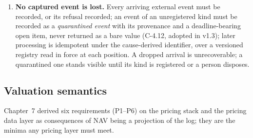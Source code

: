 \documentclass[11pt,a4paper]{article}
\begin{document}
\begin{enumerate}[label=\textbf{M\arabic*.}, ref=M\arabic*, leftmargin=*, itemsep=3pt]
  sufficiency obligation of Chapter~\ref{ch:collateral} and Chapter~\ref{ch:invariants}.
\item \textbf{No captured event is lost.} Every arriving external event must be recorded,
  or its refusal recorded; an event of an unregistered kind must be recorded as a
  \emph{quarantined event} with its provenance and a deadline-bearing open item, never
  returned as a bare value (C-4.12, adopted in v1.3); later processing is idempotent
  under the cause-derived identifier, over a versioned registry read in force at each
  position. A dropped arrival is unrecoverable; a quarantined one stands visible until its
  kind is registered or a person disposes.
\end{enumerate}

\subsection{Valuation semantics}

Chapter~7 derived six requirements (P1--P6) on the pricing stack and the pricing data layer as
consequences of NAV being a projection of the log; they are the minima any pricing layer must
meet.
\end{document}
